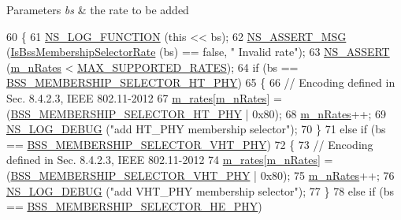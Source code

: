\begin{DoxyParams}{Parameters}
{\em bs} & the rate to be added \\
\hline
\end{DoxyParams}

\begin{DoxyCode}
60 \{
61   \hyperlink{log-macros-disabled_8h_a90b90d5bad1f39cb1b64923ea94c0761}{NS\_LOG\_FUNCTION} (\textcolor{keyword}{this} << bs);
62   \hyperlink{assert_8h_aff5ece9066c74e681e74999856f08539}{NS\_ASSERT\_MSG} (\hyperlink{classns3_1_1SupportedRates_a60fabea64f3e9789f33743525c0bac6d}{IsBssMembershipSelectorRate} (bs) == \textcolor{keyword}{false}, \textcolor{stringliteral}{"
      Invalid rate"});
63   \hyperlink{assert_8h_a6dccdb0de9b252f60088ce281c49d052}{NS\_ASSERT} (\hyperlink{classns3_1_1SupportedRates_a48bc8bd88b3c7abae9fcd75fd40c4279}{m\_nRates} < \hyperlink{classns3_1_1SupportedRates_ac9bc5778c688e7b70f17dc4536de3922}{MAX\_SUPPORTED\_RATES});
64   \textcolor{keywordflow}{if} (bs == \hyperlink{supported-rates_8cc_a08a3756893bcc2106eaa3e4c2c8b85a9}{BSS\_MEMBERSHIP\_SELECTOR\_HT\_PHY})
65     \{
66       \textcolor{comment}{// Encoding defined in Sec. 8.4.2.3, IEEE 802.11-2012}
67       \hyperlink{classns3_1_1SupportedRates_a4b17159f12e29a88e82b8a92507e4884}{m\_rates}[\hyperlink{classns3_1_1SupportedRates_a48bc8bd88b3c7abae9fcd75fd40c4279}{m\_nRates}] = (\hyperlink{supported-rates_8cc_a08a3756893bcc2106eaa3e4c2c8b85a9}{BSS\_MEMBERSHIP\_SELECTOR\_HT\_PHY} | 
      0x80);
68       \hyperlink{classns3_1_1SupportedRates_a48bc8bd88b3c7abae9fcd75fd40c4279}{m\_nRates}++;
69       \hyperlink{group__logging_ga413f1886406d49f59a6a0a89b77b4d0a}{NS\_LOG\_DEBUG} (\textcolor{stringliteral}{"add HT\_PHY membership selector"});
70     \}
71   \textcolor{keywordflow}{else} \textcolor{keywordflow}{if} (bs == \hyperlink{supported-rates_8cc_acb3ac24cdcc68c1a711dee3fcca1227d}{BSS\_MEMBERSHIP\_SELECTOR\_VHT\_PHY})
72     \{
73       \textcolor{comment}{// Encoding defined in Sec. 8.4.2.3, IEEE 802.11-2012}
74       \hyperlink{classns3_1_1SupportedRates_a4b17159f12e29a88e82b8a92507e4884}{m\_rates}[\hyperlink{classns3_1_1SupportedRates_a48bc8bd88b3c7abae9fcd75fd40c4279}{m\_nRates}] = (\hyperlink{supported-rates_8cc_acb3ac24cdcc68c1a711dee3fcca1227d}{BSS\_MEMBERSHIP\_SELECTOR\_VHT\_PHY} | 
      0x80);
75       \hyperlink{classns3_1_1SupportedRates_a48bc8bd88b3c7abae9fcd75fd40c4279}{m\_nRates}++;
76       \hyperlink{group__logging_ga413f1886406d49f59a6a0a89b77b4d0a}{NS\_LOG\_DEBUG} (\textcolor{stringliteral}{"add VHT\_PHY membership selector"});
77     \}
78   \textcolor{keywordflow}{else} \textcolor{keywordflow}{if} (bs == \hyperlink{supported-rates_8cc_a76abd34ec3750141a3a21e1add951999}{BSS\_MEMBERSHIP\_SELECTOR\_HE\_PHY})

\end{DoxyCode}
